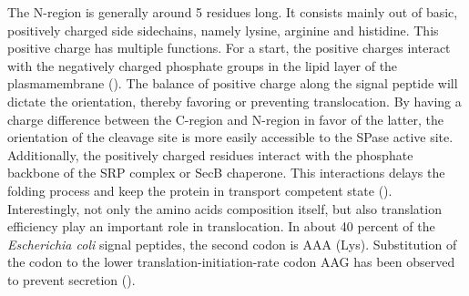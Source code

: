 The N-region is generally around 5 residues long.
It consists mainly out of basic, positively charged side sidechains,
namely lysine, arginine and histidine.
This positive charge has multiple functions.
For a start, the positive charges interact with the negatively charged phosphate groups in the lipid layer of the plasmamembrane
(\cite{von1990}).
The balance of positive charge along the signal peptide will dictate the orientation,
thereby favoring or preventing translocation.
By having a charge difference between the C-region and N-region in favor of the latter,
the orientation of the cleavage site is more easily accessible to the SPase active site.
Additionally, the positively charged residues interact with the phosphate backbone of the SRP complex or SecB chaperone.
This interactions delays the folding process and keep the protein in transport competent state
(\cite{hardy1991}).
Interestingly, not only the amino acids composition itself,
but also translation efficiency play an important role in translocation.
In about 40 percent of the \textit{Escherichia coli} signal peptides,
the second codon is AAA (Lys).
Substitution of the codon to the lower translation-initiation-rate codon AAG has been observed to prevent secretion
(\cite{zalucki2007}).

